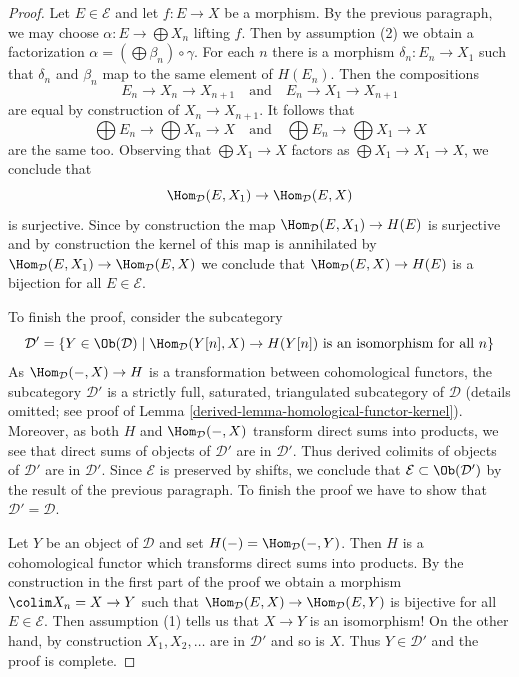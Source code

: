 \begin{proof}
\medskip\noindent
Let $E \in \mathcal{E}$ and let $f : E \to X$ be a morphism.
By the previous paragraph, we may choose $\alpha : E \to \bigoplus X_n$
lifting $f$. Then by assumption (2) we obtain a factorization
$\alpha = (\bigoplus \beta_n) \circ \gamma$.
For each $n$ there is a morphism $\delta_n : E_n \to X_1$ such that
$\delta_n$ and $\beta_n$ map to the same element of $H(E_n)$. Then
the compositions
$$
E_n \to X_n \to X_{n + 1}
\quad\text{and}\quad
E_n \to X_1 \to X_{n + 1}
$$
are equal by construction of $X_n \to X_{n + 1}$. It follows that
$$
\bigoplus E_n \to \bigoplus X_n \to X
\quad\text{and}\quad
\bigoplus E_n \to \bigoplus X_1 \to X
$$
are the same too. Observing that $\bigoplus X_1 \to X$ factors
as $\bigoplus X_1 \to X_1 \to X$, we conclude that
$$
\Hom_\mathcal{D}(E, X_1) \to \Hom_\mathcal{D}(E, X)
$$
is surjective. Since by construction the map
$\Hom_\mathcal{D}(E, X_1) \to H(E)$ is surjective and by
construction the kernel of this map is annihilated by
$\Hom_\mathcal{D}(E, X_1) \to \Hom_\mathcal{D}(E, X)$
we conclude that $\Hom_\mathcal{D}(E, X) \to H(E)$ is
a bijection for all $E \in \mathcal{E}$.

\medskip\noindent
To finish the proof, consider the subcategory
$$
\mathcal{D}' =
\{Y \in \Ob(\mathcal{D}) \mid \Hom_\mathcal{D}(Y[n], X) \to H(Y[n])
\text{ is an isomorphism for all }n\}
$$
As $\Hom_\mathcal{D}(-, X) \to H$ is a transformation between
cohomological functors,
the subcategory $\mathcal{D}'$ is a strictly full, saturated, triangulated
subcategory of $\mathcal{D}$ (details omitted; see proof of
Lemma \ref{derived-lemma-homological-functor-kernel}). Moreover, as both
$H$ and $\Hom_\mathcal{D}(-, X)$ transform direct sums into products,
we see that direct sums of objects of $\mathcal{D}'$ are in $\mathcal{D}'$.
Thus derived colimits of objects of $\mathcal{D}'$ are in $\mathcal{D}'$.
Since $\mathcal{E}$ is preserved by shifts, we conclude that
$\mathcal{E} \subset \Ob(\mathcal{D}')$ by the result of the
previous paragraph. To finish the proof we have to show that
$\mathcal{D}' = \mathcal{D}$.

\medskip\noindent
Let $Y$ be an object of $\mathcal{D}$ and set $H(-) = \Hom_\mathcal{D}(-, Y)$.
Then $H$ is a cohomological functor which transforms direct sums into products.
By the construction in the first part of the proof we obtain a morphism
$\colim X_n = X \to Y$ such that
$\Hom_\mathcal{D}(E, X) \to \Hom_\mathcal{D}(E, Y)$ is bijective for all
$E \in \mathcal{E}$. Then assumption (1) tells us that $X \to Y$ is an
isomorphism! On the other hand, by construction $X_1, X_2, \ldots$
are in $\mathcal{D}'$ and so is $X$. Thus $Y \in \mathcal{D}'$ and
the proof is complete.
\end{proof}

